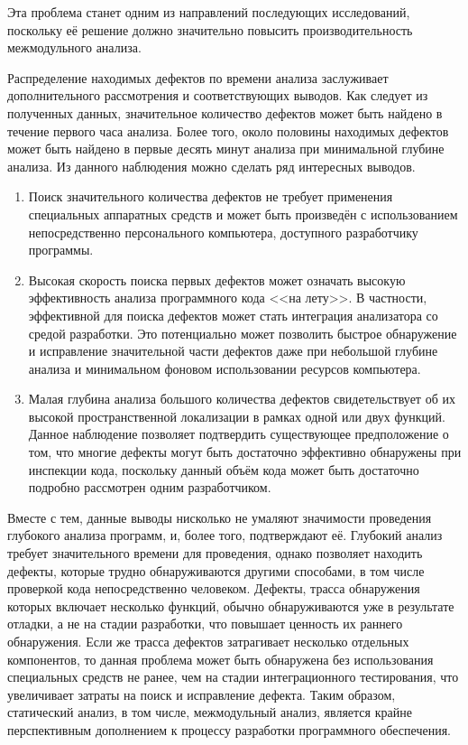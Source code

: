 Эта проблема станет одним из направлений последующих исследований, поскольку её решение должно значительно повысить производительность межмодульного анализа.

Распределение находимых дефектов по времени анализа заслуживает дополнительного рассмотрения и соответствующих выводов. Как следует из полученных данных, значительное количество дефектов может быть найдено в течение первого часа анализа. Более того, около половины находимых дефектов может быть найдено в первые десять минут анализа при минимальной глубине анализа. Из данного наблюдения можно сделать ряд интересных выводов.

\begin{enumerate}
 \item Поиск значительного количества дефектов не требует применения специальных аппаратных средств и может быть произведён с использованием непосредственно персонального компьютера, доступного разработчику программы.
 \item Высокая скорость поиска первых дефектов может означать высокую эффективность анализа программного кода <<на лету>>. В частности, эффективной для поиска дефектов может стать интеграция анализатора со средой разработки. Это потенциально может позволить быстрое обнаружение и исправление значительной части дефектов даже при небольшой глубине анализа и минимальном фоновом использовании ресурсов компьютера.
 \item Малая глубина анализа большого количества дефектов свидетельствует об их высокой пространственной локализации в рамках одной или двух функций. Данное наблюдение позволяет подтвердить существующее предположение о том, что многие дефекты могут быть достаточно эффективно обнаружены при инспекции кода, поскольку данный объём кода может быть достаточно подробно рассмотрен одним разработчиком.
\end{enumerate}

Вместе с тем, данные выводы нисколько не умаляют значимости проведения глубокого анализа программ, и, более того, подтверждают её. Глубокий анализ требует значительного времени для проведения, однако позволяет находить дефекты, которые трудно обнаруживаются другими способами, в том числе проверкой кода непосредственно человеком. Дефекты, трасса обнаружения которых включает несколько функций, обычно обнаруживаются уже в результате отладки, а не на стадии разработки, что повышает ценность их раннего обнаружения. Если же трасса дефектов затрагивает несколько отдельных компонентов, то данная проблема может быть обнаружена без использования специальных средств не ранее, чем на стадии интеграционного тестирования, что увеличивает затраты на поиск и исправление дефекта. Таким образом, статический анализ, в том числе, межмодульный анализ, является крайне перспективным дополнением к процессу разработки программного обеспечения.
